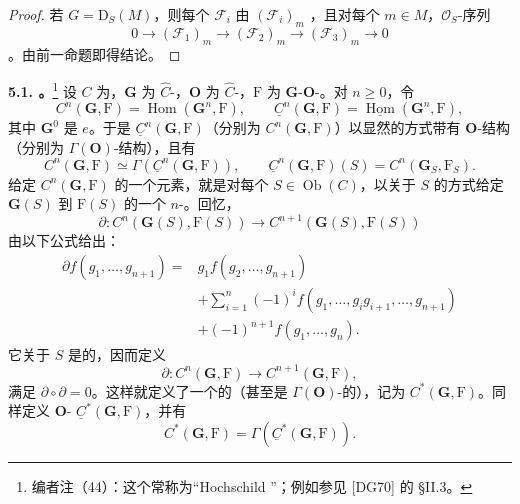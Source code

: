 \begin{proof}
若 $G=\mathrm D_S(M)$，则每个 $\mathcal F_i$ 由 $(\mathcal F_i)_m$ ，且对每个 $m\in M$，$\mathcal O_S$-序列
\[
0\longrightarrow(\mathcal F_1)_m\longrightarrow(\mathcal F_2)_m\longrightarrow(\mathcal F_3)_m\longrightarrow0
\]
。由前一命题即得结论。
\end{proof}

\textbf{5.1. 。}\footnote{编者注（44）：这个常称为“Hochschild ”；例如参见 [DG70] 的 §II.3。} 设 $C$ 为，$\mathbf G$ 为 $\widehat C$-，$\mathbf O$ 为 $\widehat C$-，$\mathrm F$ 为 $\mathbf G$-$\mathbf O$-。对 $n\geq0$，令
\[
C^n(\mathbf G,\mathrm F)=\operatorname{Hom}(\mathbf G^n,\mathrm F),\qquad
\underline C^n(\mathbf G,\mathrm F)=\underline{\operatorname{Hom}}(\mathbf G^n,\mathrm F),
\]
其中 $\mathbf G^0$ 是 $e$。于是 $\underline C^n(\mathbf G,\mathrm F)$（分别为 $C^n(\mathbf G,\mathrm F)$）以显然的方式带有 $\mathbf O$-结构（分别为 $\Gamma(\mathbf O)$-结构），且有
\[
C^n(\mathbf G,\mathrm F)\simeq\Gamma(\underline C^n(\mathbf G,\mathrm F)),\qquad
\underline C^n(\mathbf G,\mathrm F)(S)=C^n(\mathbf G_S,\mathrm F_S).
\]
给定 $C^n(\mathbf G,\mathrm F)$ 的一个元素，就是对每个 $S\in\operatorname{Ob}(C)$，以关于 $S$ 的方式给定 $\mathbf G(S)$ 到 $\mathrm F(S)$ 的一个 $n$-。回忆，
\[
\partial:C^n(\mathbf G(S),\mathrm F(S))\longrightarrow C^{n+1}(\mathbf G(S),\mathrm F(S))
\]
由以下公式给出：
\[
\begin{aligned}
\partial f(g_1,\ldots,g_{n+1})={}&g_1f(g_2,\ldots,g_{n+1})\\
&+\sum_{i=1}^n(-1)^if(g_1,\ldots,g_ig_{i+1},\ldots,g_{n+1})\\
&+(-1)^{n+1}f(g_1,\ldots,g_n).
\end{aligned}
\]
它关于 $S$ 是的，因而定义
\[
\partial:C^n(\mathbf G,\mathrm F)\longrightarrow C^{n+1}(\mathbf G,\mathrm F),
\]
满足 $\partial\circ\partial=0$。这样就定义了一个的（甚至是 $\Gamma(\mathbf O)$-的），记为 $C^*(\mathbf G,\mathrm F)$。同样定义 $\mathbf O$- $\underline C^*(\mathbf G,\mathrm F)$，并有
\[
C^*(\mathbf G,\mathrm F)=\Gamma(\underline C^*(\mathbf G,\mathrm F)).
\]
